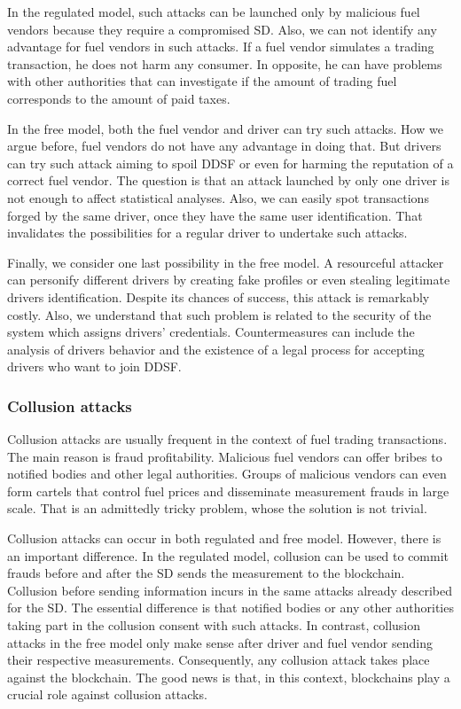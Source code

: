 \documentclass[sigplan]{acmart}
\begin{document}
In the regulated model, such attacks can be launched only by malicious fuel vendors because they require a compromised SD.
Also, we can not identify any advantage for fuel vendors in such attacks.
If a fuel vendor simulates a trading transaction, he does not harm any consumer.
In opposite, he can have problems with other authorities that can investigate if the amount of trading fuel corresponds to the amount of paid taxes.

In the free model, both the fuel vendor and driver can try such attacks.
How we argue before, fuel vendors do not have any advantage in doing that.
But drivers can try such attack aiming to spoil DDSF or even for harming the reputation of a correct fuel vendor.
The question is that an attack launched by only one driver is not enough to affect statistical analyses.
Also, we can easily spot transactions forged by the same driver, once they have the same user identification.
That invalidates the possibilities for a regular driver to undertake such attacks.

Finally, we consider one last possibility in the free model.
A resourceful attacker can personify different drivers by creating fake profiles or even stealing legitimate drivers identification.
Despite its chances of success, this attack is remarkably costly.
Also, we understand that such problem is related to the security of the system which assigns drivers' credentials.
Countermeasures can include the analysis of drivers behavior and the existence of a legal process for accepting drivers who want to join DDSF.

\subsubsection{Collusion attacks}
Collusion attacks are usually frequent in the context of fuel trading transactions.
The main reason is fraud profitability.
Malicious fuel vendors can offer bribes to notified bodies and other legal authorities.
Groups of malicious vendors can even form cartels that control fuel prices and disseminate measurement frauds in large scale.
That is an admittedly tricky problem, whose the solution is not trivial.

Collusion attacks can occur in both regulated and free model.
However, there is an important difference.
In the regulated model, collusion can be used to commit frauds before and after the SD sends the measurement to the blockchain.
Collusion before sending information incurs in the same attacks already described for the SD.
The essential difference is that notified bodies or any other authorities taking part in the collusion consent with such attacks.
In contrast, collusion attacks in the free model only make sense after driver and fuel vendor sending their respective measurements.
Consequently, any collusion attack takes place against the blockchain.
The good news is that, in this context, blockchains play a crucial role against collusion attacks.
\end{document}
